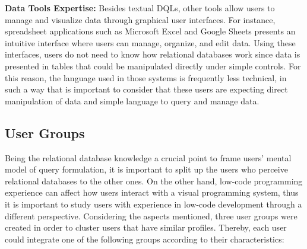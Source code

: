 \medskip

\textbf{Data Tools Expertise: } Besides textual \glspl{DQL}, other tools allow users to manage and visualize data through graphical user interfaces. For instance, spreadsheet applications such as Microsoft Excel \cite{microsoftExcel} and Google Sheets \cite{googleSheets} presents an intuitive interface where users can manage, organize, and edit data. Using these interfaces, users do not need to know how relational databases work since data is presented in tables that could be manipulated directly under simple controls. For this reason, the language used in those systems is frequently less technical, in such a way that is important to consider that these users are expecting direct manipulation of data and simple language to query and manage data.


\subsection{User Groups}
\label{subsec:user_groups}

Being the relational database knowledge a crucial point to frame users' mental model of query formulation, it is important to split up the users who perceive relational databases to the other ones. On the other hand, low-code programming experience can affect how users interact with a visual programming system, thus it is important to study users with experience in low-code development through a different perspective. Considering the aspects mentioned, three user groups were created in order to cluster users that have similar profiles. Thereby, each user could integrate one of the following groups according to their characteristics:

